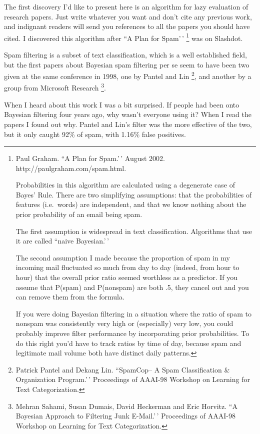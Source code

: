 \documentclass[12pt]{book}
\begin{document}
The first discovery I'd like to present here is an algorithm for lazy
evaluation of research papers. Just write whatever you want and don't
cite any previous work, and indignant readers will send you references
to all the papers you should have cited. I discovered this algorithm
after ``A Plan for Spam'\,' \footnote{Paul Graham. ``A Plan for Spam.'\,' August 2002.
http://paulgraham.com/spam.html.

Probabilities in this algorithm are calculated using a degenerate case
of Bayes' Rule. There are two simplifying assumptions: that the
probabilities of features (i.e.~words) are independent, and that we know
nothing about the prior probability of an email being spam.

The first assumption is widespread in text classification. Algorithms
that use it are called ``naive Bayesian.'\,'

The second assumption I made because the proportion of spam in my
incoming mail fluctuated so much from day to day (indeed, from hour to
hour) that the overall prior ratio seemed worthless as a predictor. If
you assume that P(spam) and P(nonspam) are both .5, they cancel out and
you can remove them from the formula.

If you were doing Bayesian filtering in a situation where the ratio of
spam to nonspam was consistently very high or (especially) very low, you
could probably improve filter performance by incorporating prior
probabilities. To do this right you'd have to track ratios by time of
day, because spam and legitimate mail volume both have distinct daily
patterns.} was on Slashdot.

Spam filtering is a subset of text classification, which is a well
established field, but the first papers about Bayesian spam filtering
per se seem to have been two given at the same conference in 1998, one
by Pantel and Lin \footnote{Patrick Pantel and Dekang Lin. ``SpamCop-- A Spam Classification
\& Organization Program.'\,' Proceedings of AAAI-98 Workshop on Learning
for Text Categorization.}, and another by a group from Microsoft
Research \footnote{Mehran Sahami, Susan Dumais, David Heckerman and Eric Horvitz.
``A Bayesian Approach to Filtering Junk E-Mail.'\,' Proceedings of
AAAI-98 Workshop on Learning for Text Categorization.}.

When I heard about this work I was a bit surprised. If people had been
onto Bayesian filtering four years ago, why wasn't everyone using it?
When I read the papers I found out why. Pantel and Lin's filter was the
more effective of the two, but it only caught 92\% of spam, with 1.16\%
false positives.
\end{document}
